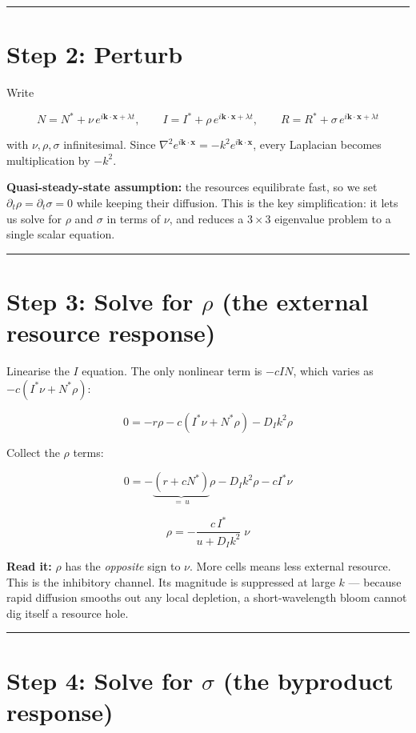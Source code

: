 \documentclass[11pt]{article}
\begin{document}
\bigskip\hrule\bigskip

\section*{Step 2: Perturb}

Write

\[
N = N^* + \nu\, e^{i\mathbf{k}\cdot\mathbf{x} + \lambda t}, \qquad I = I^* + \rho\, e^{i\mathbf{k}\cdot\mathbf{x}+\lambda t}, \qquad R = R^* + \sigma\, e^{i\mathbf{k}\cdot\mathbf{x}+\lambda t}
\]

with $\nu, \rho, \sigma$ infinitesimal. Since $\nabla^2 e^{i\mathbf{k}\cdot\mathbf{x}} = -k^2 e^{i\mathbf{k}\cdot\mathbf{x}}$, every Laplacian becomes multiplication by $-k^2$.

\textbf{Quasi-steady-state assumption:} the resources equilibrate fast, so we set $\partial_t \rho = \partial_t\sigma = 0$ while keeping their diffusion. This is the key simplification: it lets us solve for $\rho$ and $\sigma$ in terms of $\nu$, and reduces a $3\times3$ eigenvalue problem to a single scalar equation.

\bigskip\hrule\bigskip

\section*{Step 3: Solve for $\rho$ (the external resource response)}

Linearise the $I$ equation. The only nonlinear term is $-c I N$, which varies as $-c(I^*\nu + N^*\rho)$:

\[
0 = -r\rho - c\left(I^*\nu + N^*\rho\right) - D_Ik^2\rho
\]

Collect the $\rho$ terms:

\[
0 = -\underbrace{\left(r + cN^*\right)}_{=\,u}\rho - D_Ik^2\rho - cI^*\nu
\]

\[
\boxed{\;\rho = -\frac{c\, I^*}{u + D_Ik^2}\;\nu\;}
\]

\textbf{Read it:} $\rho$ has the \emph{opposite} sign to $\nu$. More cells means less external resource. This is the inhibitory channel. Its magnitude is suppressed at large $k$ --- because rapid diffusion smooths out any local depletion, a short-wavelength bloom cannot dig itself a resource hole.

\bigskip\hrule\bigskip

\section*{Step 4: Solve for $\sigma$ (the byproduct response)}
\end{document}
